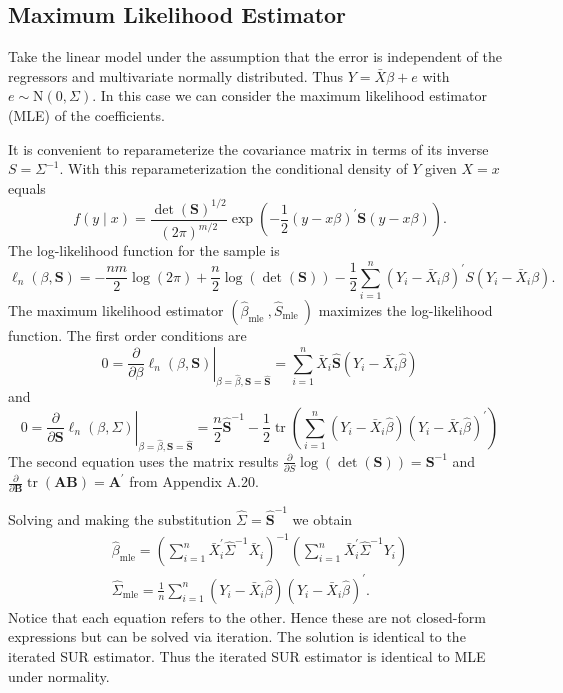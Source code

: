 \documentclass[10pt]{article}
\begin{document}
\subsection{Maximum Likelihood Estimator}
Take the linear model under the assumption that the error is independent of the regressors and multivariate normally distributed. Thus $Y=\bar{X} \beta+e$ with $e \sim \mathrm{N}(0, \Sigma)$. In this case we can consider the maximum likelihood estimator (MLE) of the coefficients.

It is convenient to reparameterize the covariance matrix in terms of its inverse $S=\Sigma^{-1}$. With this reparameterization the conditional density of $Y$ given $X=x$ equals
$$
f(y \mid x)=\frac{\operatorname{det}(\boldsymbol{S})^{1 / 2}}{(2 \pi)^{m / 2}} \exp \left(-\frac{1}{2}(y-x \beta)^{\prime} \boldsymbol{S}(y-x \beta)\right) .
$$
The log-likelihood function for the sample is
$$
\ell_{n}(\beta, \boldsymbol{S})=-\frac{n m}{2} \log (2 \pi)+\frac{n}{2} \log (\operatorname{det}(\boldsymbol{S}))-\frac{1}{2} \sum_{i=1}^{n}\left(Y_{i}-\bar{X}_{i} \beta\right)^{\prime} S\left(Y_{i}-\bar{X}_{i} \beta\right) .
$$
The maximum likelihood estimator $\left(\widehat{\beta}_{\text {mle }}, \widehat{S}_{\text {mle }}\right)$ maximizes the log-likelihood function. The first order conditions are
$$
0=\left.\frac{\partial}{\partial \beta} \ell_{n}(\beta, \boldsymbol{S})\right|_{\beta=\widehat{\beta}, \boldsymbol{S}=\widehat{\boldsymbol{S}}}=\sum_{i=1}^{n} \bar{X}_{i} \widehat{\boldsymbol{S}}\left(Y_{i}-\bar{X}_{i} \widehat{\beta}\right)
$$
and
$$
0=\left.\frac{\partial}{\partial \boldsymbol{S}} \ell_{n}(\beta, \Sigma)\right|_{\beta=\widehat{\beta}, \boldsymbol{S}=\widehat{\boldsymbol{S}}}=\frac{n}{2} \widehat{\boldsymbol{S}}^{-1}-\frac{1}{2} \operatorname{tr}\left(\sum_{i=1}^{n}\left(Y_{i}-\bar{X}_{i} \widehat{\beta}\right)\left(Y_{i}-\bar{X}_{i} \widehat{\beta}\right)^{\prime}\right)
$$
The second equation uses the matrix results $\frac{\partial}{\partial S} \log (\operatorname{det}(\boldsymbol{S}))=\boldsymbol{S}^{-1}$ and $\frac{\partial}{\partial \boldsymbol{B}} \operatorname{tr}(\boldsymbol{A B})=\boldsymbol{A}^{\prime}$ from Appendix A.20.

Solving and making the substitution $\widehat{\Sigma}=\widehat{\boldsymbol{S}}^{-1}$ we obtain
$$
\begin{gathered}
\widehat{\beta}_{\mathrm{mle}}=\left(\sum_{i=1}^{n} \bar{X}_{i}^{\prime} \widehat{\Sigma}^{-1} \bar{X}_{i}\right)^{-1}\left(\sum_{i=1}^{n} \bar{X}_{i}^{\prime} \widehat{\Sigma}^{-1} Y_{i}\right) \\
\widehat{\Sigma}_{\mathrm{mle}}=\frac{1}{n} \sum_{i=1}^{n}\left(Y_{i}-\bar{X}_{i} \widehat{\beta}\right)\left(Y_{i}-\bar{X}_{i} \widehat{\beta}\right)^{\prime} .
\end{gathered}
$$
Notice that each equation refers to the other. Hence these are not closed-form expressions but can be solved via iteration. The solution is identical to the iterated SUR estimator. Thus the iterated SUR estimator is identical to MLE under normality.
\end{document}
